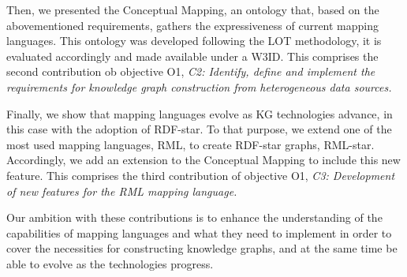 Then, we presented the Conceptual Mapping, an ontology that, based on the abovementioned requirements, gathers the expressiveness of current mapping languages. This ontology was developed following the LOT methodology, it is evaluated accordingly and made available under a W3ID. 
This comprises the second contribution ob objective O1, \textit{C2: Identify, define and implement the requirements for knowledge graph construction from heterogeneous data sources.}

Finally, we show that mapping languages evolve as KG technologies advance, in this case with the adoption of RDF-star. To that purpose, we extend one of the most used mapping languages, RML, to create RDF-star graphs, RML-star. Accordingly, we add an extension to the Conceptual Mapping to include this new feature. This comprises the third contribution of objective O1, \textit{C3: Development of new features for the RML mapping language.}

Our ambition with these contributions is to enhance the understanding of the capabilities of mapping languages and what they need to implement in order to cover the necessities for constructing knowledge graphs, and at the same time be able to evolve as the technologies progress.